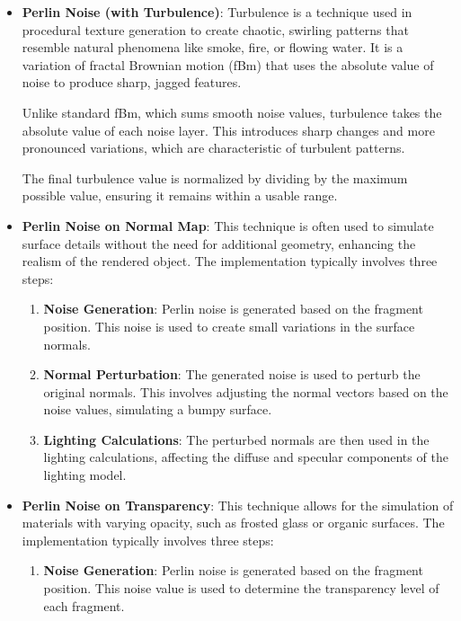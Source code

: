 \documentclass[12pt]{article}
\begin{document}
\begin{itemize}
    \item \textbf{Perlin Noise (with Turbulence)}:
    \newline
    Turbulence is a technique used in procedural texture generation to create chaotic, swirling patterns that resemble natural phenomena like smoke, fire, or flowing water. 
    It is a variation of fractal Brownian motion (fBm) that uses the absolute value of noise to produce sharp, jagged features.

    Unlike standard fBm, which sums smooth noise values, turbulence takes the absolute value of each noise layer. 
    This introduces sharp changes and more pronounced variations, which are characteristic of turbulent patterns.

    The final turbulence value is normalized by dividing by the maximum possible value, ensuring it remains within a usable range.

    \item \textbf{Perlin Noise on Normal Map}:
    \newline
    This technique is often used to simulate surface details without the need for additional geometry, enhancing the realism of the rendered object.
    The implementation typically involves three steps:
    \begin {enumerate}
        \item \textbf{Noise Generation}:
        \newline
        Perlin noise is generated based on the fragment position. This noise is used to create small variations in the surface normals.

        \item \textbf{Normal Perturbation}:
        \newline
        The generated noise is used to perturb the original normals. This involves adjusting the normal vectors based on the noise values, simulating a bumpy surface.

        \item \textbf{Lighting Calculations}:
        \newline
        The perturbed normals are then used in the lighting calculations, affecting the diffuse and specular components of the lighting model.   
    \end{enumerate}

    \item \textbf{Perlin Noise on Transparency}:
    \newline
    This technique allows for the simulation of materials with varying opacity, such as frosted glass or organic surfaces.
    The implementation typically involves three steps:
    \begin {enumerate}
        \item \textbf{Noise Generation}:
        \newline
        Perlin noise is generated based on the fragment position. This noise value is used to determine the transparency level of each fragment.


\end{enumerate}
\end{itemize}
\end{document}
